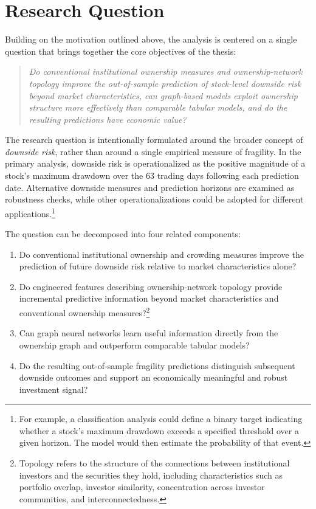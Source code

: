 \section{Research Question}
\label{sec:research_question}

Building on the motivation outlined above, the analysis is centered on a single question that brings together the core objectives of the thesis:

\begin{quote}
    \textit{Do conventional institutional ownership measures and ownership-network topology improve the out-of-sample prediction of stock-level downside risk beyond market characteristics, can graph-based models exploit ownership structure more effectively than comparable tabular models, and do the resulting predictions have economic value?}
\end{quote}

\noindent
The research question is intentionally formulated around the broader concept of \emph{downside risk}, rather than around a single empirical measure of fragility. In the primary analysis, downside risk is operationalized as the positive magnitude of a stock's maximum drawdown over the 63 trading days following each prediction date. Alternative downside measures and prediction horizons are examined as robustness checks, while other operationalizations could be adopted for different applications.\footnote{For example, a classification analysis could define a binary target indicating whether a stock's maximum drawdown exceeds a specified threshold over a given horizon. The model would then estimate the probability of that event.}

The question can be decomposed into four related components:

\begin{enumerate}
    \item Do conventional institutional ownership and crowding measures improve the prediction of future downside risk relative to market characteristics alone?

    \item Do engineered features describing ownership-network topology provide incremental predictive information beyond market characteristics and conventional ownership measures?\footnote{Topology refers to the structure of the connections between institutional investors and the securities they hold, including characteristics such as portfolio overlap, investor similarity, concentration across investor communities, and interconnectedness.}

    \item Can graph neural networks learn useful information directly from the ownership graph and outperform comparable tabular models?

    \item Do the resulting out-of-sample fragility predictions distinguish subsequent downside outcomes and support an economically meaningful and robust investment signal?
\end{enumerate}

